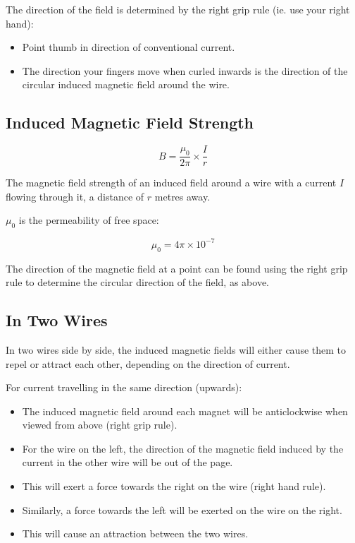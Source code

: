\documentclass[a4paper,11pt]{article}
\begin{document}
The direction of the field is determined by the right grip rule (ie. use your
right hand):

\begin{itemize}
\item Point thumb in direction of conventional current.
\item The direction your fingers move when curled inwards is the direction of
	the circular induced magnetic field around the wire.
\end{itemize}


\subsection{Induced Magnetic Field Strength}

$$
B = \frac{\mu_0}{2\pi} \times \frac{I}{r}
$$

The magnetic field strength of an induced field around a wire with a current
$I$ flowing through it, a distance of $r$ metres away.

$\mu_0$ is the permeability of free space:

$$
\mu_0 = 4\pi \times 10^{-7}
$$

The direction of the magnetic field at a point can be found using the right
grip rule to determine the circular direction of the field, as above.


\subsection{In Two Wires}

In two wires side by side, the induced magnetic fields will either cause them
to repel or attract each other, depending on the direction of current.

For current travelling in the same direction (upwards):

\begin{itemize}
\item The induced magnetic field around each magnet will be anticlockwise when
	viewed from above (right grip rule).
\item For the wire on the left, the direction of the magnetic field induced by
	the current in the other wire will be out of the page.
\item This will exert a force towards the right on the wire (right hand rule).
\item Similarly, a force towards the left will be exerted on the wire on the
	right.
\item This will cause an attraction between the two wires.
\end{itemize}
\end{document}
